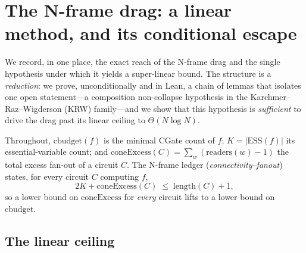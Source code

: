 %
%

\section{The N-frame drag: a linear method, and its conditional escape}
\label{sec:nframe-krw-reduction}

We record, in one place, the exact reach of the N-frame drag and the single
hypothesis under which it yields a super-linear bound.  The structure is a
\emph{reduction}: we prove, unconditionally and in Lean, a chain of lemmas that
isolates one open statement---a composition non-collapse hypothesis in the
Karchmer--Raz--Wigderson (KRW) family---and we show that this hypothesis is
\emph{sufficient} to drive the drag past its linear ceiling to $\Theta(N\log N)$.

Throughout, $\mathrm{cbudget}(f)$ is the minimal CGate count of $f$;
$K=|\mathrm{ESS}(f)|$ its essential-variable count; and
$\mathrm{coneExcess}(C)=\sum_{w}(\mathrm{readers}(w)-1)$ the total excess fan-out
of a circuit $C$.  The N-frame ledger (\emph{connectivity--fanout}) states, for
every circuit $C$ computing $f$,
\begin{equation}
  2K + \mathrm{coneExcess}(C) \;\le\; \mathrm{length}(C)+1 ,
  \tag{Ledger}
  \label{eq:ledger}
\end{equation}
so a lower bound on $\mathrm{coneExcess}$ for \emph{every} circuit lifts to a
lower bound on $\mathrm{cbudget}$.

\subsection{The linear ceiling}

